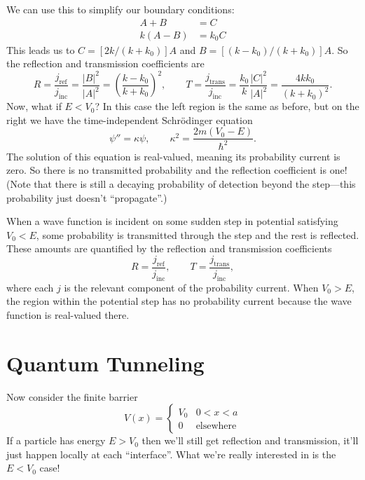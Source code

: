 \documentclass[../p052main.tex]{subfiles}
\begin{document}
We can use this to simplify our boundary conditions:
\begin{align*}
    A + B &= C \\
    k(A - B) &= k_0 C
\end{align*}
This leads us to $C = [2k / (k + k_0)] A$ and $B = [(k - k_0) / (k + k_0)]A$.
So the reflection and transmission coefficients are
\[ R = \frac{j_\textrm{ref}}{j_\textrm{inc}} = \frac{|B|^2}{|A|^2} = \left( \frac{k - k_0}{k + k_0} \right)^2, \qquad T = \frac{j_\textrm{trans}}{j_\textrm{inc}} = \frac{k_0}{k} \frac{|C|^2}{|A|^2} = \frac{4kk_0}{(k + k_0)^2}. \]
Now, what if $E < V_0$?
In this case the left region is the same as before, but on the right we have the time-independent Schrödinger equation
\[ \psi'' = \kappa \psi, \qquad \kappa^2 = \frac{2m(V_0 - E)}{\hbar^2}. \]
The solution of this equation is real-valued, meaning its probability current is zero.
So there is no transmitted probability and the reflection coefficient is one!
(Note that there is still a decaying probability of detection beyond the step---this probability just doesn't ``propagate''.)

\begin{summary}
    When a wave function is incident on some sudden step in potential satisfying $V_0 < E$, some probability is transmitted through the step and the rest is reflected.
    These amounts are quantified by the reflection and transmission coefficients
    \[ R = \frac{j_\textrm{ref}}{j_\textrm{inc}}, \qquad T = \frac{j_\textrm{trans}}{j_\textrm{inc}}, \]
    where each $j$ is the relevant component of the probability current.
    When $V_0 > E$, the region within the potential step has no probability current because the wave function is real-valued there.
\end{summary}

\section{Quantum Tunneling}
Now consider the finite barrier
\[ V(x) = \begin{cases} V_0 & 0 < x < a \\ 0 & \text{elsewhere} \end{cases} \]
If a particle has energy $E > V_0$ then we'll still get reflection and transmission, it'll just happen locally at each ``interface''.
What we're really interested in is the $E < V_0$ case!
\end{document}
